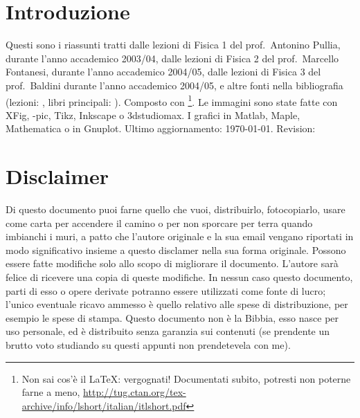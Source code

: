 \sffamily\itshape
\section*{\centering Introduzione}

Questi sono i riassunti tratti dalle lezioni di Fisica 1 del %
prof.~Antonino Pullia, durante l'anno accademico 2003/04, dalle lezioni di Fisica 2 del prof.~Marcello Fontanesi, durante l'anno accademico 2004/05, dalle lezioni di Fisica 3 del prof.~Baldini durante l'anno accademico 2004/05, e altre fonti nella bibliografia (lezioni: \cite{Pullia, Fontanesi, Baldini, Paganoni, Lucchini, Franzoni, Monica, Barney, Maddalena}, libri principali: \cite{Fisica1, Feynm, modern, elettro, ottica, enge, alonso, jackson}). Composto con \LaTeXe\footnote{Non sai cos'è il \LaTeX: vergognati! Documentati subito, potresti non poterne farne a meno, \href{http://tug.ctan.org/tex-archive/info/lshort/italian/itlshort.pdf}{http://tug.ctan.org/tex-archive/info/lshort/italian/itlshort.pdf}}. Le immagini sono state fatte con XFig, \Xy-pic, Tikz, Inkscape o 3dstudiomax. I grafici in Matlab, Maple, Mathematica o in Gnuplot.
\newline\newline
Ultimo aggiornamento: \today. Revision: \SVNRevision

\section*{\centering Disclaimer}
Di questo documento puoi farne quello che vuoi, distribuirlo, fotocopiarlo, usare come carta per accendere il camino o per non sporcare per terra quando imbianchi i muri, a patto che l'autore originale e la sua email vengano riportati in modo significativo insieme a questo disclamer nella sua forma originale. Possono essere fatte modifiche solo allo scopo di migliorare il do\-cu\-men\-to. L'autore sarà felice di ricevere una copia di queste modifiche. In nessun caso questo documento, parti di esso o opere derivate potranno essere utilizzati come  fonte di lucro; l'unico eventuale ricavo ammesso è quello relativo alle spese di distribuzione, per esempio le spese di stampa. Questo documento non è la Bibbia, esso nasce per uso personale, ed è distribuito senza garanzia sui contenuti (se prendente un brutto voto studiando su questi appunti non prendetevela con me).
